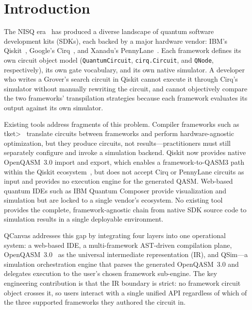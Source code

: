 \documentclass[runningheads]{llncs}
\begin{document}

\section{Introduction}

The NISQ era~\cite{preskill2018} has produced a diverse landscape of quantum software development kits (SDKs), each backed by a major hardware vendor: IBM's Qiskit~\cite{qiskit2023}, Google's Cirq~\cite{cirq2024}, and Xanadu's PennyLane~\cite{bergholm2022}. Each framework defines its own circuit object model (\texttt{QuantumCircuit}, \texttt{cirq.Circuit}, and \texttt{QNode}, respectively), its own gate vocabulary, and its own native simulator. A developer who writes a Grover's search circuit in Qiskit cannot execute it through Cirq's simulator without manually rewriting the circuit, and cannot objectively compare the two frameworks' transpilation strategies because each framework evaluates its output against its own simulator.

Existing tools address fragments of this problem. Compiler frameworks such as \textsf{t\textbar ket\textgreater}~\cite{sivarajah2020} translate circuits between frameworks and perform hardware-agnostic optimization, but they produce circuits, not results---practitioners must still separately configure and invoke a simulation backend. Qiskit now provides native OpenQASM~3.0 import and export, which enables a framework-to-QASM3 path within the Qiskit ecosystem~\cite{qiskit2023}, but does not accept Cirq or PennyLane circuits as input and provides no execution engine for the generated QASM. Web-based quantum IDEs such as IBM Quantum Composer provide visualization and simulation but are locked to a single vendor's ecosystem. No existing tool provides the complete, framework-agnostic chain from native SDK source code to simulation results in a single deployable environment.

QCanvas addresses this gap by integrating four layers into one operational system: a web-based IDE, a multi-framework AST-driven compilation plane, OpenQASM~3.0~\cite{cross2022} as the universal intermediate representation (IR), and QSim---a simulation orchestration engine that parses the generated OpenQASM~3.0 and delegates execution to the user's chosen framework sub-engine. The key engineering contribution is that the IR boundary is strict: no framework circuit object crosses it, so users interact with a single unified API regardless of which of the three supported frameworks they authored the circuit in.
\end{document}
